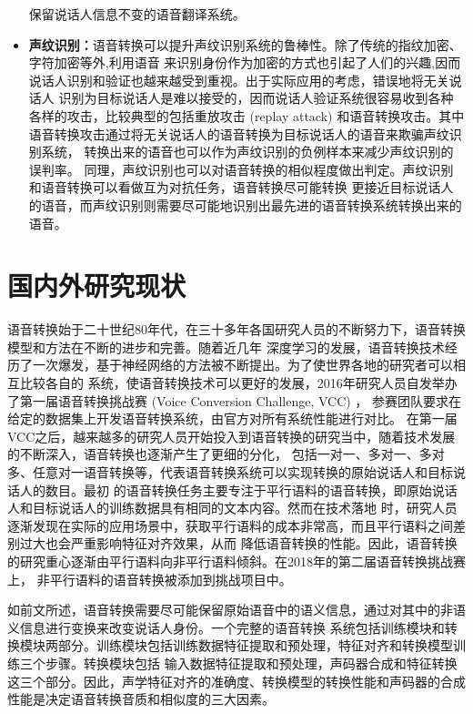 \begin{itemize}
    保留说话人信息不变的语音翻译系统\cite{desai2010spectral}。
    \item \textbf{声纹识别：}语音转换可以提升声纹识别系统的鲁棒性。除了传统的指纹加密、字符加密等外,利用语音
    来识别身份作为加密的方式也引起了人们的兴趣,因而说话人识别和验证也越来越受到重视。出于实际应用的考虑，错误地将无关说话人
    识别为目标说话人是难以接受的，因而说话人验证系统很容易收到各种各样的攻击，比较典型的包括重放攻击 (replay attack) 
    和语音转换攻击。其中语音转换攻击通过将无关说话人的语音转换为目标说话人的语音来欺骗声纹识别系统，
    转换出来的语音也可以作为声纹识别的负例样本来减少声纹识别的误判率\cite{kinnunen2012vulnerability}。
    同理，声纹识别也可以对语音转换的相似程度做出判定。声纹识别和语音转换可以看做互为对抗任务，语音转换尽可能转换
    更接近目标说话人的语音，而声纹识别则需要尽可能地识别出最先进的语音转换系统转换出来的语音。

\end{itemize}

\section{国内外研究现状}
语音转换始于二十世纪80年代，在三十多年各国研究人员的不断努力下，语音转换模型和方法在不断的进步和完善。随着近几年
深度学习的发展，语音转换技术经历了一次爆发，基于神经网络的方法被不断提出。为了使世界各地的研究者可以相互比较各自的
系统，使语音转换技术可以更好的发展，2016年研究人员自发举办了第一届语音转换挑战赛 (Voice Conversion Challenge, VCC) ，
参赛团队要求在给定的数据集上开发语音转换系统，由官方对所有系统性能进行对比\cite{toda2016voice,wester2016analysis}。
在第一届VCC之后，越来越多的研究人员开始投入到语音转换的研究当中，随着技术发展的不断深入，语音转换也逐渐产生了更细的分化，
包括一对一、多对一、多对多、任意对一语音转换等，代表语音转换系统可以实现转换的原始说话人和目标说话人的数目。最初
的语音转换任务主要专注于平行语料的语音转换，即原始说话人和目标说话人的训练数据具有相同的文本内容。然而在技术落地
时，研究人员逐渐发现在实际的应用场景中，获取平行语料的成本非常高，而且平行语料之间差别过大也会严重影响特征对齐效果，从而
降低语音转换的性能。因此，语音转换的研究重心逐渐由平行语料向非平行语料倾斜。在2018年的第二届语音转换挑战赛上，
非平行语料的语音转换被添加到挑战项目中\cite{lorenzo2018voice}。

如前文所述，语音转换需要尽可能保留原始语音中的语义信息，通过对其中的非语义信息进行变换来改变说话人身份。一个完整的语音转换
系统包括训练模块和转换模块两部分。训练模块包括训练数据特征提取和预处理，特征对齐和转换模型训练三个步骤。转换模块包括
输入数据特征提取和预处理，声码器合成和特征转换这三个部分。因此，声学特征对齐的准确度、转换模型的转换性能和声码器的合成
性能是决定语音转换音质和相似度的三大因素。

